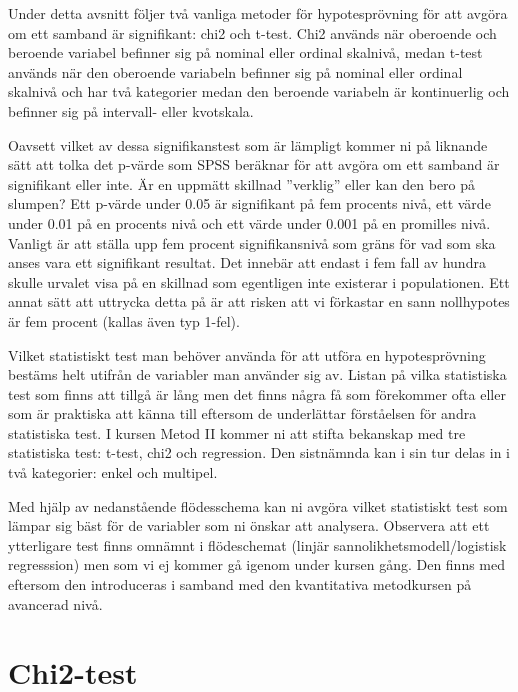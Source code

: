 \documentclass[
]{book}
\begin{document}
Under detta avsnitt följer två vanliga metoder för hypotesprövning för att avgöra om ett samband är
signifikant: chi2 och t-test. Chi2 används när oberoende och beroende variabel befinner sig på nominal
eller ordinal skalnivå, medan t-test används när den oberoende variabeln befinner sig på nominal eller
ordinal skalnivå och har två kategorier medan den beroende variabeln är kontinuerlig och befinner sig
på intervall- eller kvotskala.

Oavsett vilket av dessa signifikanstest som är lämpligt kommer ni på liknande sätt att tolka det p-värde
som SPSS beräknar för att avgöra om ett samband är signifikant eller inte. Är en uppmätt skillnad
''verklig'' eller kan den bero på slumpen? Ett p-värde under 0.05 är signifikant på fem procents nivå, ett
värde under 0.01 på en procents nivå och ett värde under 0.001 på en promilles nivå. Vanligt är att
ställa upp fem procent signifikansnivå som gräns för vad som ska anses vara ett signifikant resultat. Det
innebär att endast i fem fall av hundra skulle urvalet visa på en skillnad som egentligen inte existerar i
populationen. Ett annat sätt att uttrycka detta på är att risken att vi förkastar en sann nollhypotes är
fem procent (kallas även typ 1-fel).

Vilket statistiskt test man behöver använda för att utföra en hypotesprövning bestäms helt utifrån de variabler man använder sig av.
Listan på vilka statistiska test som finns att tillgå är lång men det finns några få som förekommer ofta eller som är praktiska att känna till
eftersom de underlättar förståelsen för andra statistiska test. I kursen Metod II kommer ni att stifta bekanskap med tre statistiska test:
t-test, chi2 och regression. Den sistnämnda kan i sin tur delas in i två kategorier: enkel och multipel.

Med hjälp av nedanstående flödesschema kan ni avgöra vilket statistiskt test som lämpar sig bäst för de variabler som ni önskar att analysera. Observera att ett ytterligare
test finns omnämnt i flödeschemat (linjär sannolikhetsmodell/logistisk regresssion) men som vi ej kommer gå igenom under kursen gång.
Den finns med eftersom den introduceras i samband med den kvantitativa metodkursen på avancerad nivå.

\hypertarget{chi2-test}{%
\chapter{Chi2-test}\label{chi2-test}}
\end{document}
